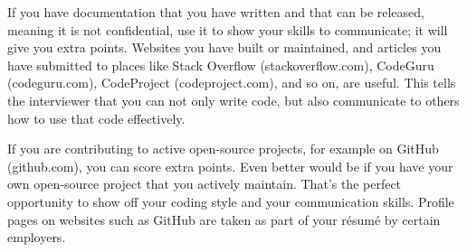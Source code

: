 If you have documentation that you have written and that can be released, meaning it is not confidential, use it to show your skills to communicate; it will give you extra points. Websites you have built or maintained, and articles you have submitted to places like Stack Overflow (stackoverflow.com), CodeGuru (codeguru.com), CodeProject (codeproject.com), and so on, are useful. This tells the interviewer that you can not only write code, but also communicate to others how to use that code effectively.

If you are contributing to active open-source projects, for example on GitHub (github.com), you can score extra points. Even better would be if you have your own open-source project that you actively maintain. That’s the perfect opportunity to show off your coding style and your communication skills.
Profile pages on websites such as GitHub are taken as part of your résumé by certain employers.













